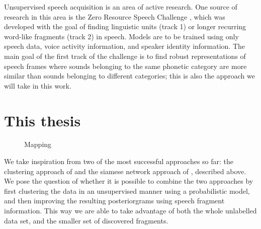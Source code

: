 Unsupervised speech acquisition is an area of active research.
One source of research in this area is the Zero Resource Speech Challenge \parencite{versteegh2015zero}, which was developed with the goal of finding linguistic units (track 1) or longer recurring word-like fragments (track 2) in speech.
Models are to be trained using only speech data, voice activity information, and speaker identity information.
The main goal of the first track of the challenge is to find robust representations of speech frames where sounds belonging to the same phonetic category are more similar than sounds belonging to different categories; this is also the approach we will take in this work.



\section{This thesis}

\begin{figure}
  \centering

  \caption{\label{fig:mapping}Mapping}
\end{figure}


We take inspiration from two of the most successful approaches so far: the clustering approach of \textcite{chen2015parallel} and the siamese network approach of \textcite{thiolliere2015hybrid}, described above.
We pose the question of whether it is possible to combine the two approaches by first clustering the data in an unsupervised manner using a probabilistic model, and then improving the resulting posteriorgrams using speech fragment information.
This way we are able to take advantage of both the whole unlabelled data set, and the smaller set of discovered fragments.

